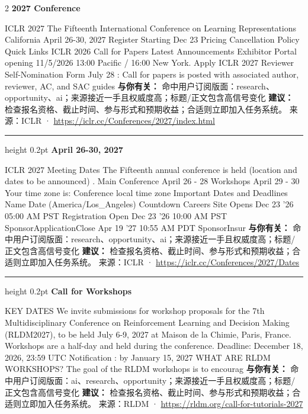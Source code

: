 \documentclass[10.5pt]{ctexart}
\begin{document}
\begin{multicols}{2}
{\large\bfseries 2027 Conference}\par
ICLR 2027 The Fifteenth International Conference on Learning Representations California April 26-30, 2027 Register Starting Dec 23 Pricing Cancellation Policy Quick Links ICLR 2026 Call for Papers Latest Announcements Exhibitor Portal opening 11/5/2026 13:00 Pacific / 16:00 New York. Apply ICLR 2027 Reviewer Self-Nomination Form July 28 : Call for papers is posted with associated author, reviewer, AC, and SAC guides 
\textbf{与你有关：} 命中用户订阅版面：research、opportunity、ai；来源接近一手且权威度高；标题/正文包含高信号变化
\textbf{建议：} 检查报名资格、截止时间、参与形式和预期收益；合适则立即加入任务系统。
{\footnotesize\color{ormuted} 来源：ICLR · \url{https://iclr.cc/Conferences/2027/index.html}}
\vspace{2mm}
\hrule height 0.2pt
\vspace{2mm}
{\large\bfseries April 26-30, 2027}\par
ICLR 2027 Meeting Dates The Fifteenth annual conference is held (location and dates to be announced) . Main Conference April 26 - 28 Workshops April 29 - 30 Your time zone is: Conference local time zone Important Dates and Deadlines Name Date (America/Los\_Angeles) Countdown Careers Site Opens Dec 23 '26 05:00 AM PST Registration Open Dec 23 '26 10:00 AM PST SponsorApplicationClose Apr 19 '27 10:55 AM PDT SponsorInsur
\textbf{与你有关：} 命中用户订阅版面：research、opportunity、ai；来源接近一手且权威度高；标题/正文包含高信号变化
\textbf{建议：} 检查报名资格、截止时间、参与形式和预期收益；合适则立即加入任务系统。
{\footnotesize\color{ormuted} 来源：ICLR · \url{https://iclr.cc/Conferences/2027/Dates}}
\vspace{2mm}
\hrule height 0.2pt
\vspace{2mm}
{\large\bfseries Call for Workshops}\par
KEY DATES We invite submissions for workshop proposals for the 7th Multidisciplinary Conference on Reinforcement Learning and Decision Making (RLDM2027), to be held July 6-9, 2027 at Maison de la Chimie, Paris, France. Workshops are a half-day and held during the conference. Deadline: December 18, 2026, 23:59 UTC Notification : by January 15, 2027 WHAT ARE RLDM WORKSHOPS? The goal of the RLDM workshops is to encourag
\textbf{与你有关：} 命中用户订阅版面：ai、research、opportunity；来源接近一手且权威度高；标题/正文包含高信号变化
\textbf{建议：} 检查报名资格、截止时间、参与形式和预期收益；合适则立即加入任务系统。
{\footnotesize\color{ormuted} 来源：RLDM · \url{https://rldm.org/call-for-tutorials-2027}}

\end{multicols}
\end{document}
